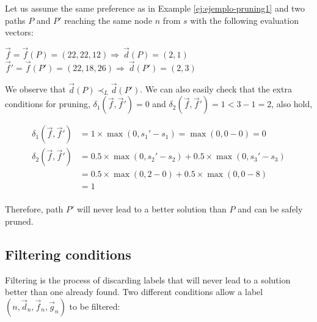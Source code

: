 \begin{ejemplo}\label{ej:ejemplo-pruning2}
Let us assume the same preference as in Example \ref{ej:ejemplo-pruning1} and two paths $P$ and $P'$ reaching the same node $n$ from $s$ with the following evaluation vectors:

\begin{center}
$\vec f = \vec{f}(P) = (22, 22, 12) \Rightarrow \ \vec{d}(P) = (2,1)$ \\
$\vec f' = \vec{f}(P') = (22, 18, 26) \Rightarrow \ \vec{d}(P') = (2,3)$
\end{center}

We observe that $\vec{d}(P) \prec_L \vec{d}(P')$. We can also easily check that the extra conditions for pruning, $\delta_1(\vec{f}, \vec{f}') = 0$ and $\delta_2(\vec{f}, \vec{f}') = 1 < 3 - 1 = 2$, also hold,


\begin{displaymath}
  \begin{array}{ll}
    \delta_1(\vec{f}, \vec{f}') & = 1 \times \max(0, s_1' - s_1) = \max(0, 0-0)  = 0 \\
    \delta_2(\vec{f}, \vec{f}') & = 0.5 \times \max(0, s_2' - s_2) + 0.5 \times \max(0, s_3' - s_3) \\
                               & = 0.5 \times \max(0, 2-0) + 0.5 \times \max(0, 0-8) \\
                               & = 1 \\
  \end{array}
\end{displaymath}

Therefore, path $P'$ will never lead to a better solution than $P$ and can be safely pruned.
\end{ejemplo}

\subsection{Filtering conditions}
\label{subsubsec:Filtering-conditions}

Filtering is the process of discarding labels that will never lead to a solution better than one already found. Two different conditions allow a label $(n, \vec{d}_n, \vec{f}_n, \vec{g}_n)$ to be filtered:

